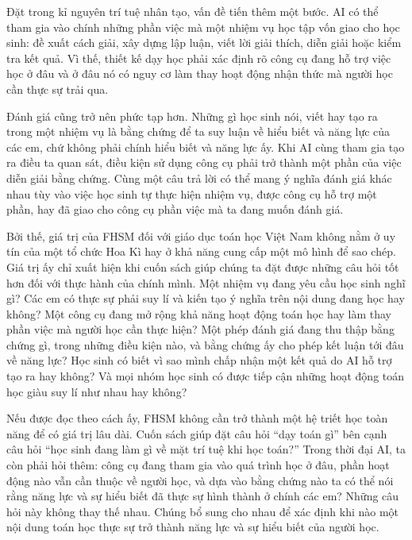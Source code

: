 Đặt trong kỉ nguyên trí tuệ nhân tạo, vấn đề tiến thêm một bước. AI có thể tham gia vào chính những phần việc mà một nhiệm vụ học tập vốn giao cho học sinh: đề xuất cách giải, xây dựng lập luận, viết lời giải thích, diễn giải hoặc kiểm tra kết quả. Vì thế, thiết kế dạy học phải xác định rõ công cụ đang hỗ trợ việc học ở đâu và ở đâu nó có nguy cơ làm thay hoạt động nhận thức mà người học cần thực sự trải qua.

Đánh giá cũng trở nên phức tạp hơn. Những gì học sinh nói, viết hay tạo ra trong một nhiệm vụ là bằng chứng để ta suy luận về hiểu biết và năng lực của các em, chứ không phải chính hiểu biết và năng lực ấy. Khi AI cùng tham gia tạo ra điều ta quan sát, điều kiện sử dụng công cụ phải trở thành một phần của việc diễn giải bằng chứng. Cùng một câu trả lời có thể mang ý nghĩa đánh giá khác nhau tùy vào việc học sinh tự thực hiện nhiệm vụ, được công cụ hỗ trợ một phần, hay đã giao cho công cụ phần việc mà ta đang muốn đánh giá.

Bởi thế, giá trị của FHSM đối với giáo dục toán học Việt Nam không nằm ở uy tín của một tổ chức Hoa Kì hay ở khả năng cung cấp một mô hình để sao chép. Giá trị ấy chỉ xuất hiện khi cuốn sách giúp chúng ta đặt được những câu hỏi tốt hơn đối với thực hành của chính mình. Một nhiệm vụ đang yêu cầu học sinh nghĩ gì? Các em có thực sự phải suy lí và kiến tạo ý nghĩa trên nội dung đang học hay không? Một công cụ đang mở rộng khả năng hoạt động toán học hay làm thay phần việc mà người học cần thực hiện? Một phép đánh giá đang thu thập bằng chứng gì, trong những điều kiện nào, và bằng chứng ấy cho phép kết luận tới đâu về năng lực? Học sinh có biết vì sao mình chấp nhận một kết quả do AI hỗ trợ tạo ra hay không? Và mọi nhóm học sinh có được tiếp cận những hoạt động toán học giàu suy lí như nhau hay không?

Nếu được đọc theo cách ấy, FHSM không cần trở thành một hệ triết học toàn năng để có giá trị lâu dài. Cuốn sách giúp đặt câu hỏi ``dạy toán gì'' bên cạnh câu hỏi ``học sinh đang làm gì về mặt trí tuệ khi học toán?'' Trong thời đại AI, ta còn phải hỏi thêm: công cụ đang tham gia vào quá trình học ở đâu, phần hoạt động nào vẫn cần thuộc về người học, và dựa vào bằng chứng nào ta có thể nói rằng năng lực và sự hiểu biết đã thực sự hình thành ở chính các em? Những câu hỏi này không thay thế nhau. Chúng bổ sung cho nhau để xác định khi nào một nội dung toán học thực sự trở thành năng lực và sự hiểu biết của người học.

{}
